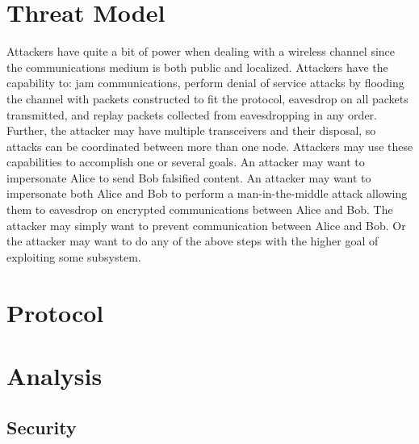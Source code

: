 \documentclass[12pt,dvips]{report}
\begin{document}
\section{Threat Model}
Attackers have quite a bit of power when dealing with a wireless channel since the communications medium is both public and localized. Attackers have the capability to: jam communications, perform denial of service attacks by flooding the channel with packets constructed to fit the protocol, eavesdrop on all packets transmitted, and replay packets collected from eavesdropping in any order. Further, the attacker may have multiple transceivers and their disposal, so attacks can be coordinated between more than one node.
Attackers may use these capabilities to accomplish one or several goals. An attacker may want to impersonate Alice to send Bob falsified content. An attacker may want to impersonate both Alice and Bob to perform a man-in-the-middle attack allowing them to eavesdrop on encrypted communications between Alice and Bob. The attacker may simply want to prevent communication between Alice and Bob. Or the attacker may want to do any of the above steps with the higher goal of exploiting some subsystem.

\section{Protocol}



\section{Analysis}
\subsection{Security}
\end{document}
